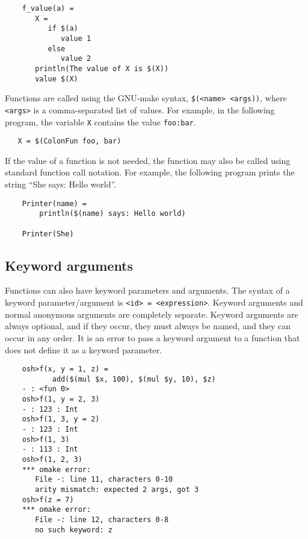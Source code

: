 \begin{verbatim}
    f_value(a) =
       X =
          if $(a)
             value 1
          else
             value 2
       println(The value of X is $(X))
       value $(X)
\end{verbatim}

Functions are called using the GNU-make syntax, \verb+$(<name> <args))+,
where \verb+<args>+ is a comma-separated list of values.  For example,
in the following program, the variable \verb+X+ contains the
value \verb+foo:bar+.

\begin{verbatim}
   X = $(ColonFun foo, bar)
\end{verbatim}

If the value of a function is not needed, the function may also be called
using standard function call notation.  For example, the following program
prints the string ``She says: Hello world''.

\begin{verbatim}
    Printer(name) =
        println($(name) says: Hello world)

    Printer(She)
\end{verbatim}

\subsection{Keyword arguments}
\label{section:keyword-arguments}

\newinkeyword

Functions can also have keyword parameters and arguments.  The syntax of a keyword
parameter/argument is \verb+<id> = <expression>+.  Keyword arguments and normal anonymous arguments
are completely separate.  Keyword arguments are always optional, and if they occur, they must always
be named, and they can occur in any order.  It is an error to pass a keyword argument to a function
that does not define it as a keyword parameter.

\begin{verbatim}
    osh>f(x, y = 1, z) =
           add($(mul $x, 100), $(mul $y, 10), $z)
    - : <fun 0>
    osh>f(1, y = 2, 3)
    - : 123 : Int
    osh>f(1, 3, y = 2)
    - : 123 : Int
    osh>f(1, 3)
    - : 113 : Int
    osh>f(1, 2, 3)
    *** omake error:
       File -: line 11, characters 0-10
       arity mismatch: expected 2 args, got 3
    osh>f(z = 7)
    *** omake error:
       File -: line 12, characters 0-8
       no such keyword: z
\end{verbatim}   

